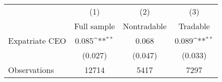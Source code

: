 {
\def\sym#1{\ifmmode^{#1}\else\(^{#1}\)\fi}
\begin{tabular}{l*{3}{c}}
\hline\hline
                    &\multicolumn{1}{c}{(1)}&\multicolumn{1}{c}{(2)}&\multicolumn{1}{c}{(3)}\\
                    &\multicolumn{1}{c}{Full sample}&\multicolumn{1}{c}{Nontradable}&\multicolumn{1}{c}{Tradable}\\
\hline
Expatriate CEO      &       0.085\sym{**} &       0.068         &       0.089\sym{**} \\
                    &     (0.027)         &     (0.047)         &     (0.033)         \\
\hline
Observations        &       12714         &        5417         &        7297         \\
\hline\hline
\end{tabular}
}
